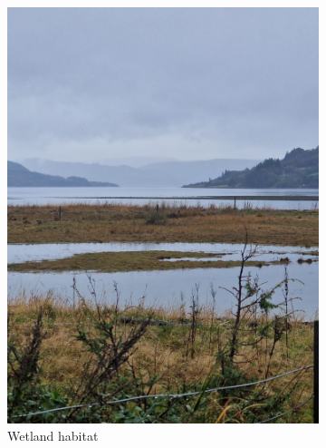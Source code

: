\documentclass[twocolumn]{article}
\begin{document}
\begin{figure}[H]
\centering
\begin{subfigure}{0.48\columnwidth}
\includegraphics[width=\textwidth]{01_wetland_landscape_mountains.jpg}
\caption{Wetland habitat}
\end{subfigure}
\hfill
\begin{subfigure}{0.48\columnwidth}

\end{subfigure}
\end{figure}
\end{document}
